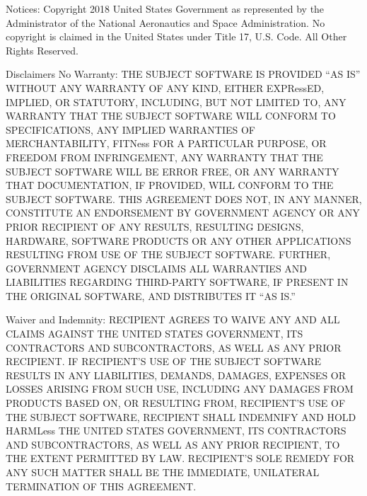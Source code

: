 \documentclass[letterpaper,10pt,english]{sphinxmanual}
\begin{document}
\label{\detokenize{source_code:module-smcpy.smc.particle_initializer}}
Notices:
Copyright 2018 United States Government as represented by the Administrator of
the National Aeronautics and Space Administration. No copyright is claimed in
the United States under Title 17, U.S. Code. All Other Rights Reserved.

Disclaimers
No Warranty: THE SUBJECT SOFTWARE IS PROVIDED “AS IS” WITHOUT ANY WARRANTY OF
ANY KIND, EITHER EXPRessED, IMPLIED, OR STATUTORY, INCLUDING, BUT NOT LIMITED
TO, ANY WARRANTY THAT THE SUBJECT SOFTWARE WILL CONFORM TO SPECIFICATIONS, ANY
IMPLIED WARRANTIES OF MERCHANTABILITY, FITNess FOR A PARTICULAR PURPOSE, OR
FREEDOM FROM INFRINGEMENT, ANY WARRANTY THAT THE SUBJECT SOFTWARE WILL BE ERROR
FREE, OR ANY WARRANTY THAT DOCUMENTATION, IF PROVIDED, WILL CONFORM TO THE
SUBJECT SOFTWARE. THIS AGREEMENT DOES NOT, IN ANY MANNER, CONSTITUTE AN
ENDORSEMENT BY GOVERNMENT AGENCY OR ANY PRIOR RECIPIENT OF ANY RESULTS,
RESULTING DESIGNS, HARDWARE, SOFTWARE PRODUCTS OR ANY OTHER APPLICATIONS
RESULTING FROM USE OF THE SUBJECT SOFTWARE.  FURTHER, GOVERNMENT AGENCY
DISCLAIMS ALL WARRANTIES AND LIABILITIES REGARDING THIRD-PARTY SOFTWARE, IF
PRESENT IN THE ORIGINAL SOFTWARE, AND DISTRIBUTES IT “AS IS.”

Waiver and Indemnity:  RECIPIENT AGREES TO WAIVE ANY AND ALL CLAIMS AGAINST THE
UNITED STATES GOVERNMENT, ITS CONTRACTORS AND SUBCONTRACTORS, AS WELL AS ANY
PRIOR RECIPIENT.  IF RECIPIENT’S USE OF THE SUBJECT SOFTWARE RESULTS IN ANY
LIABILITIES, DEMANDS, DAMAGES, EXPENSES OR LOSSES ARISING FROM SUCH USE,
INCLUDING ANY DAMAGES FROM PRODUCTS BASED ON, OR RESULTING FROM, RECIPIENT’S
USE OF THE SUBJECT SOFTWARE, RECIPIENT SHALL INDEMNIFY AND HOLD HARMLess THE
UNITED STATES GOVERNMENT, ITS CONTRACTORS AND SUBCONTRACTORS, AS WELL AS ANY
PRIOR RECIPIENT, TO THE EXTENT PERMITTED BY LAW.  RECIPIENT’S SOLE REMEDY FOR
ANY SUCH MATTER SHALL BE THE IMMEDIATE, UNILATERAL TERMINATION OF THIS
AGREEMENT.
\end{document}
